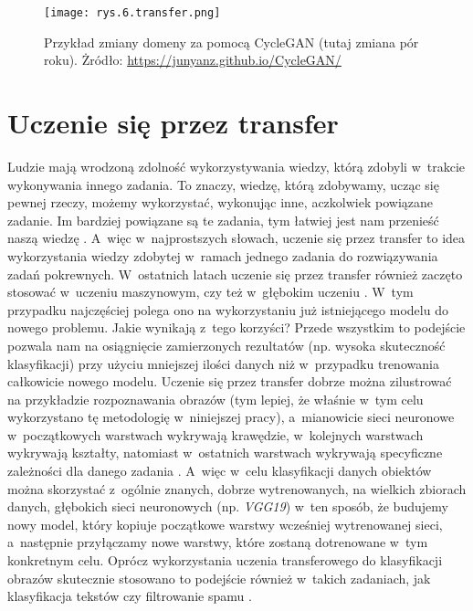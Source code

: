 \begin{figure}[h]
    \centering
    \texttt{[image: rys.6.transfer.png]}
    \caption{Przykład zmiany domeny za pomocą CycleGAN (tutaj zmiana pór roku). \protect\linebreak Żródło: \protect\url{https://junyanz.github.io/CycleGAN/}}
    \label{fig:mesh6}
\end{figure}

\section{Uczenie się przez transfer}
\label{cha:cha3.5}

Ludzie mają wrodzoną zdolność wykorzystywania wiedzy, którą zdobyli w~trakcie wykonywania innego zadania. To znaczy, wiedzę, którą zdobywamy, ucząc się pewnej rzeczy, możemy wykorzystać, wykonując inne, aczkolwiek powiązane zadanie. Im bardziej powiązane są te zadania, tym łatwiej jest nam przenieść naszą wiedzę \cite{Sarkar18}. A~więc w~najprostszych słowach, uczenie się przez transfer to idea wykorzystania wiedzy zdobytej w~ramach jednego zadania do rozwiązywania zadań pokrewnych. W~ostatnich latach uczenie się przez transfer również zaczęto stosować w~uczeniu maszynowym, czy też w~głębokim uczeniu \cite{Chmiel20}. W~tym przypadku najczęściej polega ono na wykorzystaniu już istniejącego modelu do nowego problemu. Jakie wynikają z~tego korzyści? Przede wszystkim to podejście pozwala nam na osiągnięcie zamierzonych rezultatów (np. wysoka skuteczność klasyfikacji) przy użyciu mniejszej ilości danych niż w~przypadku trenowania całkowicie nowego modelu. 
Uczenie się przez transfer dobrze można zilustrować na przykładzie rozpoznawania obrazów (tym lepiej, że właśnie w~tym celu wykorzystano tę metodologię w~niniejszej pracy), a~mianowicie sieci neuronowe w~początkowych warstwach wykrywają krawędzie, w~kolejnych warstwach wykrywają kształty, natomiast w~ostatnich warstwach wykrywają specyficzne zależności dla danego zadania \cite{Chmiel20}. A~więc w~celu klasyfikacji danych obiektów można skorzystać z~ogólnie znanych, dobrze wytrenowanych, na wielkich zbiorach danych, głębokich sieci neuronowych (np. \textit{VGG19}) w~ten sposób, że budujemy nowy model, który kopiuje początkowe warstwy wcześniej wytrenowanej sieci, a~następnie przyłączamy nowe warstwy, które zostaną dotrenowane w~tym konkretnym celu. Oprócz wykorzystania uczenia transferowego do klasyfikacji obrazów skutecznie stosowano to podejście również w~takich zadaniach, jak klasyfikacja tekstów czy filtrowanie spamu \cite{Bickel06}. 



